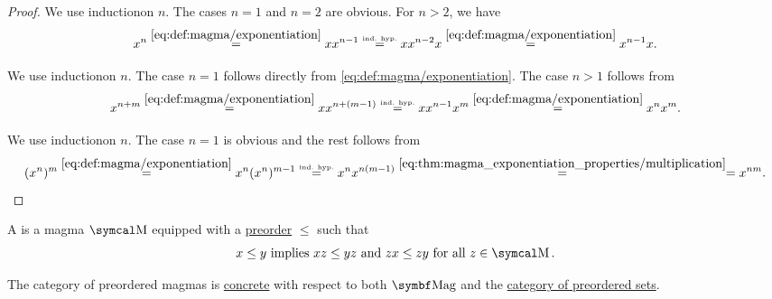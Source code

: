 \begin{proof}
   We use induction\IND on \( n \). The cases \( n = 1 \) and \( n = 2 \) are obvious. For \( n > 2 \), we have
  \begin{equation*}
    x^n
    \overset {\eqref{eq:def:magma/exponentiation}} =
    x x^{n-1}
    \overset {\scriptscriptstyle{\text{ind. hyp.}}} =
    x x^{n-2} x
    \overset {\eqref{eq:def:magma/exponentiation}} =
    x^{n-1} x.
  \end{equation*}

   We use induction\LEM on \( n \). The case \( n = 1 \) follows directly from \eqref{eq:def:magma/exponentiation}. The case \( n > 1 \) follows from
  \begin{equation*}
    x^{n + m}
    \overset {\eqref{eq:def:magma/exponentiation}} =
    x x^{n + (m - 1)}
    \overset {\scriptscriptstyle{\text{ind. hyp.}}} =
    x x^{n-1} x^m
    \overset {\eqref{eq:def:magma/exponentiation}} =
    x^n x^m.
  \end{equation*}

   We use induction\LEM on \( n \). The case \( n = 1 \) is obvious and the rest follows from
  \begin{equation*}
    (x^n)^m
    \overset {\eqref{eq:def:magma/exponentiation}} =
    x^n (x^n)^{m-1}
    \overset {\scriptscriptstyle{\text{ind. hyp.}}} =
    x^n x^{n (m - 1)}
    \overset {\eqref{eq:thm:magma_exponentiation_properties/multiplication}} =
    =
    x^{nm}.
  \end{equation*}
\end{proof}

\begin{definition}\label{def:preordered_magma}
  A  is a magma \( \CM \) equipped with a \hyperref[def:preordered_set]{preorder} \( \leq \) such that
  \begin{equation}\label{eq:def:preordered_magma/compatibility}
    x \leq y \T{implies} xz \leq yz \T{and} zx \leq zy \T{for all} z \in \CM.
  \end{equation}

  The category of preordered magmas is \hyperref[def:concrete_category]{concrete} with respect to both \( \Cat{Mag} \) and the \hyperref[def:preordered_magma]{category of preordered sets}.
\end{definition}

